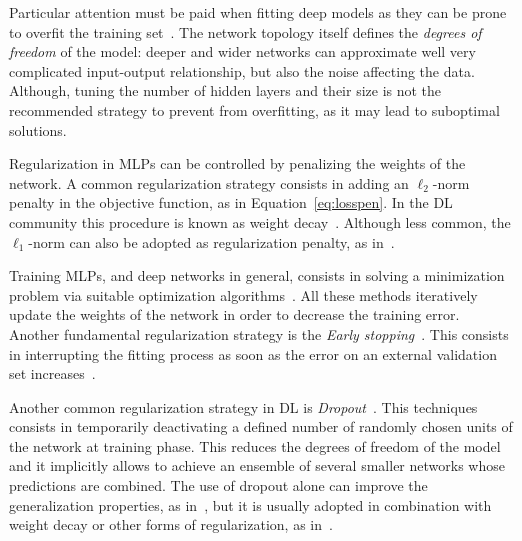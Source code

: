 	    Particular attention must be paid when fitting deep models as they can be prone to overfit the training set~\cite{angermueller2016deep}.
	    The network topology itself defines the \textit{degrees of freedom} of the model: deeper and wider networks can approximate well very complicated input-output relationship, but also the noise affecting the data.
	    Although, tuning the number of hidden layers and their size is not the recommended strategy to prevent from overfitting, as it may lead to suboptimal solutions.

	    Regularization in MLPs can be controlled by penalizing the weights of the network. A common regularization strategy consists in adding an $\ell_2$-norm penalty in the objective function, as in Equation~\eqref{eq:losspen}. In the DL community this procedure is known as weight decay~\cite{krogh1992simple}.
	    Although less common, the $\ell_1$-norm can also be adopted as regularization penalty, as in~\cite{leung2014deep}.
	    
	    Training MLPs, and deep networks in general, consists in solving a minimization problem via suitable optimization algorithms~\cite{ruder2016overview}. All these methods iteratively update the weights of the network in order to decrease the training error. Another fundamental regularization strategy is the \textit{Early stopping}~\cite{prechelt1998early}. This consists in interrupting the fitting process as soon as the error on an external validation set increases~\cite{angermueller2016deep}.

	    Another common regularization strategy in DL is \textit{Dropout}~\cite{srivastava2014dropout}. This techniques consists in temporarily deactivating a defined number of randomly chosen units of the network at training phase. This reduces the degrees of freedom of the model and it implicitly allows to achieve an ensemble of several smaller networks whose predictions are combined.
	    The use of dropout alone can improve the generalization properties, as in~\cite{Chen2016GeneEI}, but it is usually adopted in combination with weight decay or other forms of regularization, as in~\cite{leung2014deep}.
	    
